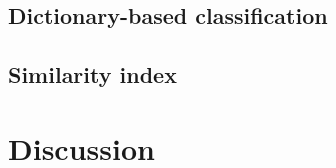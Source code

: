 \documentclass[11pt]{article}
\begin{document}
\subsection{Dictionary-based classification} \label{Subsection: Dictionary-based classification}
\subsection{Similarity index} \label{Subsection: Similarity index}

\section{Discussion} \label{Section: Discussion}

\clearpage

\end{document}
